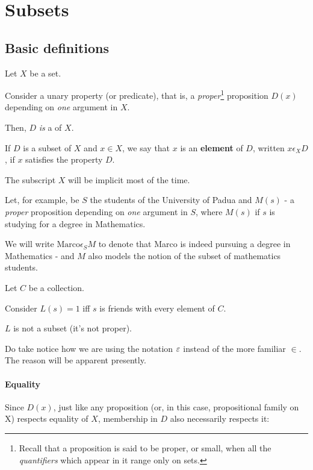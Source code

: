 \section{Subsets}
\subsection{Basic definitions}

Let $X$ be a set.

Consider a unary property (or predicate), that is, a \emph{proper}\footnote{
Recall that a proposition is said to be proper, or small, when all
the \emph{quantifiers} which appear in it range only on sets.
} proposition \(D(x)\) depending on \emph{one} argument in \(X\).

Then,  \(D\) \emph{is} a  of \(X\).

If \(D\) is a subset of \(X\) and \(x \in X\), we say that \(x\) is an
\textbf{element} of \(D\), written \(x \epsilon_X D\), if \(x\)
satisfies the property \(D\).

The subscript \(X\) will be implicit most of the time.

\begin{example}
  Let, for example, be \(S\) the students of the University of Padua
  and \(M(s)\) - a \emph{proper} proposition depending on \emph{one}
  argument in \(S\), where \(M(s)\) if \(s\) is studying for a degree
  in Mathematics.
  
  We will write \(\text{Marco} \epsilon_S M\) to denote that Marco is
  indeed pursuing a degree in Mathematics - and \(M\) also models the
  notion of the subset of mathematics students.
\end{example}

\begin{example}
  Let $C$ be a collection.
  
  Consider $L(s) = 1$ iff $s$ is friends with every element of $C$.

  $L$ is not a subset (it's not proper).
\end{example}


Do take notice how we are using the notation \(\varepsilon\) instead of the
more familiar \(\in\). The reason will be apparent presently.

\paragraph{Equality} Since \(D(x)\), just like any proposition (or, in
this case, propositional family on X) respects equality of \(X\),
membership in \(D\) also necessarily respects it:

